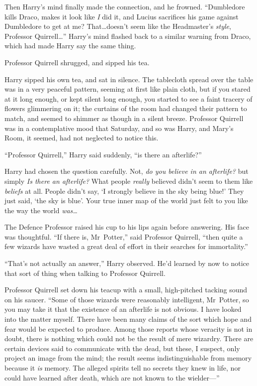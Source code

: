 Then Harry’s mind finally made the connection, and he frowned. “Dumbledore kills Draco, makes it look like \emph{I} did it, and Lucius sacrifices his game against Dumbledore to get at me? That…doesn’t seem like the Headmaster’s \emph{style}, Professor Quirrell…” Harry’s mind flashed back to a similar warning from Draco, which had made Harry say the same thing.

Professor Quirrell shrugged, and sipped his tea.

Harry sipped his own tea, and sat in silence. The tablecloth spread over the table was in a very peaceful pattern, seeming at first like plain cloth, but if you stared at it long enough, or kept silent long enough, you started to see a faint tracery of flowers glimmering on it; the curtains of the room had changed their pattern to match, and seemed to shimmer as though in a silent breeze. Professor Quirrell was in a contemplative mood that Saturday, and so was Harry, and Mary’s Room, it seemed, had not neglected to notice this.

“Professor Quirrell,” Harry said suddenly, “is there an afterlife?”

Harry had chosen the question carefully. Not, \emph{do you believe in an afterlife?} but simply \emph{Is there an afterlife?} What people \emph{really} believed didn’t seem to them like \emph{beliefs} at all. People didn’t say, ‘I strongly believe in the sky being blue!’ They just said, ‘the sky is blue’. Your true inner map of the world just felt to you like the way the world \emph{was…}

The Defence Professor raised his cup to his lips again before answering. His face was thoughtful. “If there is, Mr~Potter,” said Professor Quirrell, “then quite a few wizards have wasted a great deal of effort in their searches for immortality.”

“That’s not actually an answer,” Harry observed. He’d learned by now to notice that sort of thing when talking to Professor Quirrell.

Professor Quirrell set down his teacup with a small, high-pitched tacking sound on his saucer. “Some of those wizards were reasonably intelligent, Mr~Potter, so you may take it that the existence of an afterlife is not obvious. I have looked into the matter myself. There have been many claims of the sort which hope and fear would be expected to produce. Among those reports whose veracity is not in doubt, there is nothing which could not be the result of mere wizardry. There are certain devices said to communicate with the dead, but these, I suspect, only project an image from the mind; the result seems indistinguishable from memory because it \emph{is} memory. The alleged spirits tell no secrets they knew in life, nor could have learned after death, which are not known to the wielder—”

